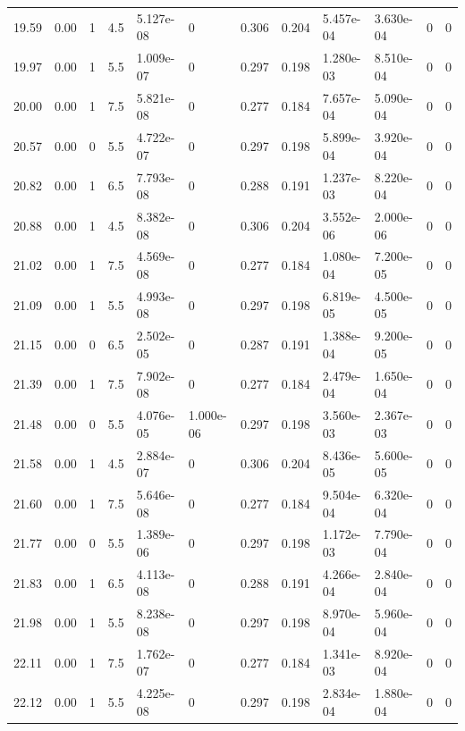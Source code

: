 \documentclass[preview]{standalone}
\begin{document}
{{{\begin{tabular}{L{1.2cm}C{1.2cm} C{0.3cm}C{0.5cm} C{1.4cm}C{1.4cm} C{1.4cm}C{1.4cm} C{1.6cm}C{1.6cm} C{1.6cm}C{1.6cm}}
  19.59  &  0.00  & 1     & 4.5 &  5.127e-08  & 0  &  0.306&   0.204& 5.457e-04 & 3.630e-04   &  0 & 0  \\ 
  19.97  &  0.00  & 1     & 5.5 &  1.009e-07  & 0  &  0.297&   0.198& 1.280e-03 & 8.510e-04   &  0 & 0  \\ 
  20.00  &  0.00  & 1     & 7.5 &  5.821e-08  & 0  &  0.277&   0.184& 7.657e-04 & 5.090e-04   &  0 & 0  \\ 
  20.57  &  0.00  & 0     & 5.5 &  4.722e-07  & 0  &  0.297&   0.198& 5.899e-04 & 3.920e-04   &  0 & 0  \\ 
  20.82  &  0.00  & 1     & 6.5 &  7.793e-08  & 0  &  0.288&   0.191& 1.237e-03 & 8.220e-04   &  0 & 0  \\ 
  20.88  &  0.00  & 1     & 4.5 &  8.382e-08  & 0  &  0.306&   0.204& 3.552e-06 & 2.000e-06   &  0 & 0  \\ 
  21.02  &  0.00  & 1     & 7.5 &  4.569e-08  & 0  &  0.277&   0.184& 1.080e-04 & 7.200e-05   &  0 & 0  \\ 
  21.09  &  0.00  & 1     & 5.5 &  4.993e-08  & 0  &  0.297&   0.198& 6.819e-05 & 4.500e-05   &  0 & 0  \\ 
  21.15  &  0.00  & 0     & 6.5 &  2.502e-05  & 0  &  0.287&   0.191& 1.388e-04 & 9.200e-05   &  0 & 0  \\ 
  21.39  &  0.00  & 1     & 7.5 &  7.902e-08  & 0  &  0.277&   0.184& 2.479e-04 & 1.650e-04   &  0 & 0  \\ 
  21.48  &  0.00  & 0     & 5.5 &  4.076e-05  & 1.000e-06  &  0.297&   0.198& 3.560e-03 & 2.367e-03   &  0 & 0  \\ 
  21.58  &  0.00  & 1     & 4.5 &  2.884e-07  & 0  &  0.306&   0.204& 8.436e-05 & 5.600e-05   &  0 & 0  \\ 
  21.60  &  0.00  & 1     & 7.5 &  5.646e-08  & 0  &  0.277&   0.184& 9.504e-04 & 6.320e-04   &  0 & 0  \\ 
  21.77  &  0.00  & 0     & 5.5 &  1.389e-06  & 0  &  0.297&   0.198& 1.172e-03 & 7.790e-04   &  0 & 0  \\ 
  21.83  &  0.00  & 1     & 6.5 &  4.113e-08  & 0  &  0.288&   0.191& 4.266e-04 & 2.840e-04   &  0 & 0  \\ 
  21.98  &  0.00  & 1     & 5.5 &  8.238e-08  & 0  &  0.297&   0.198& 8.970e-04 & 5.960e-04   &  0 & 0  \\ 
  22.11  &  0.00  & 1     & 7.5 &  1.762e-07  & 0  &  0.277&   0.184& 1.341e-03 & 8.920e-04   &  0 & 0  \\ 
  22.12  &  0.00  & 1     & 5.5 &  4.225e-08  & 0  &  0.297&   0.198& 2.834e-04 & 1.880e-04   &  0 & 0  \\ 

\end{tabular}}}}
\end{document}

